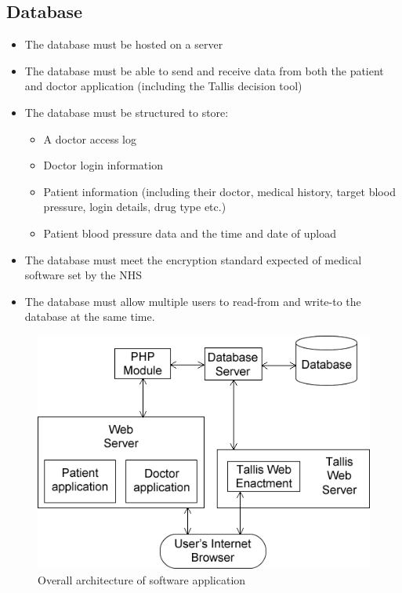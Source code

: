 \documentclass[11pt]{article}
\begin{document}
\subsection{Database}
\begin{itemize}
\item The database must be hosted on a server
\item The database must be able to send and receive data from both the patient and doctor application (including the Tallis decision tool)
\item The database must be structured to store:
	\begin{itemize}
	\item A doctor access log
    \item Doctor login information
    \item Patient information (including their doctor, medical history, target blood pressure, login details, drug type etc.)
    \item Patient blood pressure data and the time and date of upload
	\end{itemize}
\item The database must meet the encryption standard expected of medical software set by the NHS \cite{encryption}
\item The database must allow multiple users to read-from and write-to the database at the same time. 
\end{itemize}

\begin{figure}[ht]
\begin{center}
\includegraphics[scale=0.5]{network}
\caption{Overall architecture of software application}
\label{fig:network}
\end{center}
\end{figure}
\end{document}
